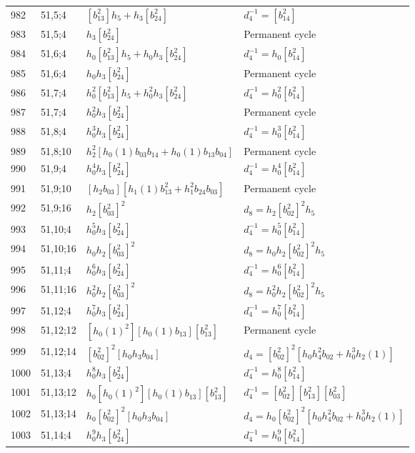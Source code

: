 \documentclass{article}
\begin{document}
\begin{longtable}{|l|l|>{\raggedright\arraybackslash}p{6cm}|>{\raggedright\arraybackslash}p{6cm}|}
\hline
982 & 51,5;4 & $[b_{13}^2]h_5 + h_3[b_{24}^2]$ & $d_{4}^{-1}=[b_{14}^2]$\\
983 & 51,5;4 & $h_3[b_{24}^2]$ & Permanent cycle\\
\hline
984 & 51,6;4 & $h_0[b_{13}^2]h_5 + h_0h_3[b_{24}^2]$ & $d_{4}^{-1}=h_0[b_{14}^2]$\\
985 & 51,6;4 & $h_0h_3[b_{24}^2]$ & Permanent cycle\\
\hline
986 & 51,7;4 & $h_0^2[b_{13}^2]h_5 + h_0^2h_3[b_{24}^2]$ & $d_{4}^{-1}=h_0^2[b_{14}^2]$\\
987 & 51,7;4 & $h_0^2h_3[b_{24}^2]$ & Permanent cycle\\
\hline
988 & 51,8;4 & $h_0^3h_3[b_{24}^2]$ & $d_{4}^{-1}=h_0^3[b_{14}^2]$\\
\hline
989 & 51,8;10 & $h_2^2[h_0(1)b_{03}b_{14} + h_0(1)b_{13}b_{04}]$ & Permanent cycle\\
\hline
990 & 51,9;4 & $h_0^4h_3[b_{24}^2]$ & $d_{4}^{-1}=h_0^4[b_{14}^2]$\\
\hline
991 & 51,9;10 & $[h_2b_{03}][h_1(1)b_{13}^2 + h_1^2b_{24}b_{03}]$ & Permanent cycle\\
\hline
992 & 51,9;16 & $h_2[b_{03}^2]^2$ &$d_{8}=h_2[b_{02}^2]^2h_5$\\
\hline
993 & 51,10;4 & $h_0^5h_3[b_{24}^2]$ & $d_{4}^{-1}=h_0^5[b_{14}^2]$\\
\hline
994 & 51,10;16 & $h_0h_2[b_{03}^2]^2$ &$d_{8}=h_0h_2[b_{02}^2]^2h_5$\\
\hline
995 & 51,11;4 & $h_0^6h_3[b_{24}^2]$ & $d_{4}^{-1}=h_0^6[b_{14}^2]$\\
\hline
996 & 51,11;16 & $h_0^2h_2[b_{03}^2]^2$ &$d_{8}=h_0^2h_2[b_{02}^2]^2h_5$\\
\hline
997 & 51,12;4 & $h_0^7h_3[b_{24}^2]$ & $d_{4}^{-1}=h_0^7[b_{14}^2]$\\
\hline
998 & 51,12;12 & $[h_0(1)^2][h_0(1)b_{13}][b_{13}^2]$ & Permanent cycle\\
\hline
999 & 51,12;14 & $[b_{02}^2]^2[h_0h_3b_{04}]$ &$d_{4}=[b_{02}^2]^2[h_0h_4^2b_{02} + h_0^3h_2(1)]$\\
\hline
1000 & 51,13;4 & $h_0^8h_3[b_{24}^2]$ & $d_{4}^{-1}=h_0^8[b_{14}^2]$\\
\hline
1001 & 51,13;12 & $h_0[h_0(1)^2][h_0(1)b_{13}][b_{13}^2]$ & $d_{4}^{-1}=[b_{02}^2][b_{13}^2][b_{03}^2]$\\
\hline
1002 & 51,13;14 & $h_0[b_{02}^2]^2[h_0h_3b_{04}]$ &$d_{4}=h_0[b_{02}^2]^2[h_0h_4^2b_{02} + h_0^3h_2(1)]$\\
\hline
1003 & 51,14;4 & $h_0^9h_3[b_{24}^2]$ & $d_{4}^{-1}=h_0^9[b_{14}^2]$\\

\end{longtable}
\end{document}

